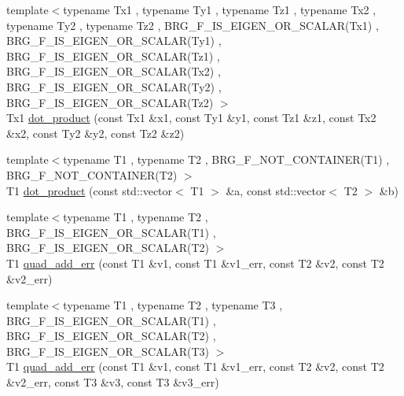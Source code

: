 \begin{DoxyCompactItemize}
\item 
{\footnotesize template$<$typename Tx1 , typename Ty1 , typename Tz1 , typename Tx2 , typename Ty2 , typename Tz2 , B\+R\+G\+\_\+\+F\+\_\+\+I\+S\+\_\+\+E\+I\+G\+E\+N\+\_\+\+O\+R\+\_\+\+S\+C\+A\+L\+A\+R(\+Tx1) , B\+R\+G\+\_\+\+F\+\_\+\+I\+S\+\_\+\+E\+I\+G\+E\+N\+\_\+\+O\+R\+\_\+\+S\+C\+A\+L\+A\+R(\+Ty1) , B\+R\+G\+\_\+\+F\+\_\+\+I\+S\+\_\+\+E\+I\+G\+E\+N\+\_\+\+O\+R\+\_\+\+S\+C\+A\+L\+A\+R(\+Tz1) , B\+R\+G\+\_\+\+F\+\_\+\+I\+S\+\_\+\+E\+I\+G\+E\+N\+\_\+\+O\+R\+\_\+\+S\+C\+A\+L\+A\+R(\+Tx2) , B\+R\+G\+\_\+\+F\+\_\+\+I\+S\+\_\+\+E\+I\+G\+E\+N\+\_\+\+O\+R\+\_\+\+S\+C\+A\+L\+A\+R(\+Ty2) , B\+R\+G\+\_\+\+F\+\_\+\+I\+S\+\_\+\+E\+I\+G\+E\+N\+\_\+\+O\+R\+\_\+\+S\+C\+A\+L\+A\+R(\+Tz2) $>$ }\\Tx1 \hyperlink{namespaceIceBRG_a7be15030ad49d6a978105c2b85d66f54}{dot\+\_\+product} (const Tx1 \&x1, const Ty1 \&y1, const Tz1 \&z1, const Tx2 \&x2, const Ty2 \&y2, const Tz2 \&z2)
\item 
{\footnotesize template$<$typename T1 , typename T2 , B\+R\+G\+\_\+\+F\+\_\+\+N\+O\+T\+\_\+\+C\+O\+N\+T\+A\+I\+N\+E\+R(\+T1) , B\+R\+G\+\_\+\+F\+\_\+\+N\+O\+T\+\_\+\+C\+O\+N\+T\+A\+I\+N\+E\+R(\+T2) $>$ }\\T1 \hyperlink{namespaceIceBRG_a263a2159bf418d0f5f84bed960ab3c81}{dot\+\_\+product} (const std\+::vector$<$ T1 $>$ \&a, const std\+::vector$<$ T2 $>$ \&b)
\item 
{\footnotesize template$<$typename T1 , typename T2 , B\+R\+G\+\_\+\+F\+\_\+\+I\+S\+\_\+\+E\+I\+G\+E\+N\+\_\+\+O\+R\+\_\+\+S\+C\+A\+L\+A\+R(\+T1) , B\+R\+G\+\_\+\+F\+\_\+\+I\+S\+\_\+\+E\+I\+G\+E\+N\+\_\+\+O\+R\+\_\+\+S\+C\+A\+L\+A\+R(\+T2) $>$ }\\T1 \hyperlink{namespaceIceBRG_a8146f3c5303dff416be460ce5262c9d7}{quad\+\_\+add\+\_\+err} (const T1 \&v1, const T1 \&v1\+\_\+err, const T2 \&v2, const T2 \&v2\+\_\+err)
\item 
{\footnotesize template$<$typename T1 , typename T2 , typename T3 , B\+R\+G\+\_\+\+F\+\_\+\+I\+S\+\_\+\+E\+I\+G\+E\+N\+\_\+\+O\+R\+\_\+\+S\+C\+A\+L\+A\+R(\+T1) , B\+R\+G\+\_\+\+F\+\_\+\+I\+S\+\_\+\+E\+I\+G\+E\+N\+\_\+\+O\+R\+\_\+\+S\+C\+A\+L\+A\+R(\+T2) , B\+R\+G\+\_\+\+F\+\_\+\+I\+S\+\_\+\+E\+I\+G\+E\+N\+\_\+\+O\+R\+\_\+\+S\+C\+A\+L\+A\+R(\+T3) $>$ }\\T1 \hyperlink{namespaceIceBRG_a921419d07502c291853529dab2eb9dd3}{quad\+\_\+add\+\_\+err} (const T1 \&v1, const T1 \&v1\+\_\+err, const T2 \&v2, const T2 \&v2\+\_\+err, const T3 \&v3, const T3 \&v3\+\_\+err)
\item 

\end{DoxyCompactItemize}
